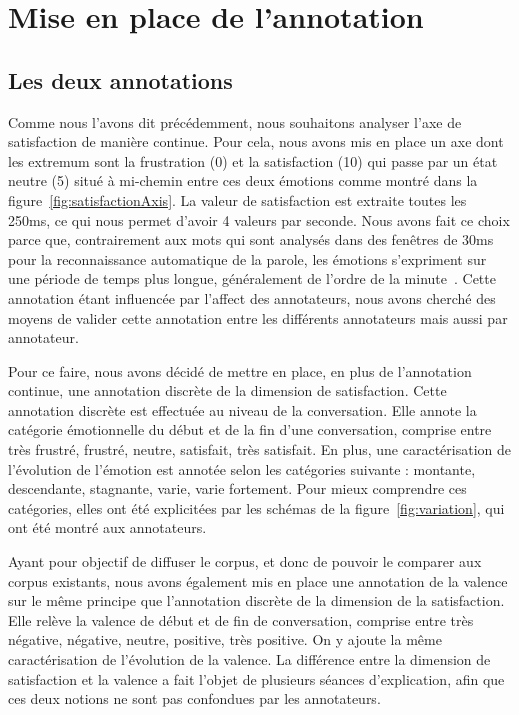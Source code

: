 \section{Mise en place de l'annotation}

\subsection{Les deux annotations}
Comme nous l'avons dit précédemment, nous souhaitons analyser l'axe de satisfaction de manière continue. Pour cela, nous avons mis en place un axe dont les extremum sont la frustration (0) et la satisfaction (10) qui passe par un état neutre (5) situé à mi-chemin entre ces deux émotions comme montré dans la figure~\ref{fig:satisfactionAxis}. La valeur de satisfaction est extraite toutes les 250ms, ce qui nous permet d'avoir 4 valeurs par seconde. Nous avons fait ce choix parce que, contrairement aux mots qui sont analysés dans des fenêtres de 30ms pour la reconnaissance automatique de la parole, les émotions s'expriment sur une période de temps plus longue, généralement de l'ordre de la minute~\cite{Schuller2010}. Cette annotation étant influencée par l'affect des annotateurs, nous avons cherché des moyens de valider cette annotation entre les différents annotateurs mais aussi par annotateur.

Pour ce faire, nous avons décidé de mettre en place, en plus de l'annotation continue, une annotation discrète de la dimension de satisfaction. Cette annotation discrète est effectuée au niveau de la conversation. Elle annote la catégorie émotionnelle du début et de la fin d'une conversation, comprise entre très frustré, frustré, neutre, satisfait, très satisfait. En plus, une caractérisation de l'évolution de l'émotion est annotée selon les catégories suivante : montante, descendante, stagnante, varie, varie fortement. Pour mieux comprendre ces catégories, elles ont été explicitées par les schémas de la figure~\ref{fig:variation}, qui ont été montré aux annotateurs.

Ayant pour objectif de diffuser le corpus, et donc de pouvoir le comparer aux corpus existants, nous avons également mis en place une annotation de la valence sur le même principe que l'annotation discrète de la dimension de la satisfaction. Elle relève la valence de début et de fin de conversation, comprise entre très négative, négative, neutre, positive, très positive. On y ajoute la même caractérisation de l'évolution de la valence.
La différence entre la dimension de satisfaction et la valence a fait l'objet de plusieurs séances d'explication, afin que ces deux notions ne sont pas confondues par les annotateurs.

